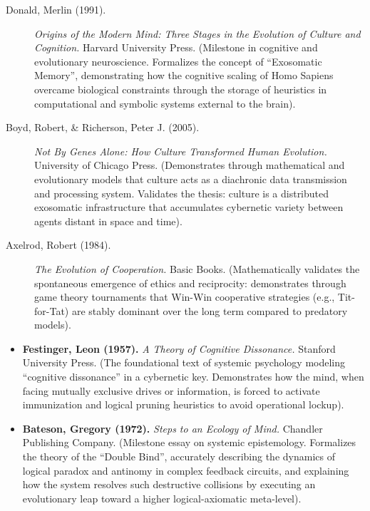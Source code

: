 \documentclass[11pt,a4paper,oneside]{article} %
\providecommand{\tightlist}{%
  \setlength{\itemsep}{0pt}\setlength{\parskip}{0pt}}
\begin{document}
\begin{description}
\item[Donald, Merlin (1991).] \emph{Origins of the Modern Mind: Three Stages in the Evolution of Culture and Cognition.} Harvard University Press. (Milestone in cognitive and evolutionary neuroscience. Formalizes the concept of ``Exosomatic Memory'', demonstrating how the cognitive scaling of Homo Sapiens overcame biological constraints through the storage of heuristics in computational and symbolic systems external to the brain).

\item[Boyd, Robert, \& Richerson, Peter J. (2005).] \emph{Not By Genes Alone: How Culture Transformed Human Evolution.} University of Chicago Press. (Demonstrates through mathematical and evolutionary models that culture acts as a diachronic data transmission and processing system. Validates the thesis: culture is a distributed exosomatic infrastructure that accumulates cybernetic variety between agents distant in space and time).
\end{description}

\hypertarget{a1.9-endogenous-emergence-of-ethical-codes}{%
\label{a1.9-endogenous-emergence-of-ethical-codes}}

\begin{description}
\item[Axelrod, Robert (1984).] \emph{The Evolution of Cooperation.} Basic Books. (Mathematically validates the spontaneous emergence of ethics and reciprocity: demonstrates through game theory tournaments that Win-Win cooperative strategies (e.g., Tit-for-Tat) are stably dominant over the long term compared to predatory models).
\end{description}

\hypertarget{a1.10-axiomatic-homeostasis-and-paradox-reduction}{%
\label{a1.10-axiomatic-homeostasis-and-paradox-reduction}}


\begin{itemize}
\tightlist
\item
  \textbf{Festinger, Leon (1957).} \emph{A Theory of Cognitive
  Dissonance.} Stanford University Press. (The foundational text of
  systemic psychology modeling ``cognitive dissonance'' in a cybernetic
  key. Demonstrates how the mind, when facing mutually exclusive drives
  or information, is forced to activate immunization and logical pruning
  heuristics to avoid operational lockup).
\item
  \textbf{Bateson, Gregory (1972).} \emph{Steps to an Ecology of Mind.}
  Chandler Publishing Company. (Milestone essay on systemic
  epistemology. Formalizes the theory of the ``Double Bind'', accurately
  describing the dynamics of logical paradox and antinomy in complex
  feedback circuits, and explaining how the system resolves such
  destructive collisions by executing an evolutionary leap toward a
  higher logical-axiomatic meta-level).
\end{itemize}
\end{document}
